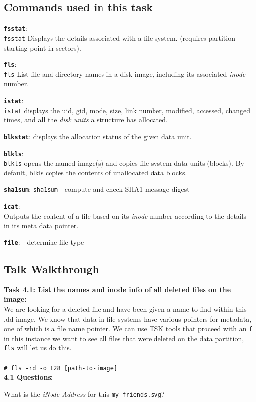 \documentclass[a4paper,11pt]{article}
\begin{document}
\subsection*{Commands used in this task}
\begin{itemize*}
	\item \textbf{\texttt{fsstat}}:\\ \texttt{fsstat} Displays the details associated with a file system. (requires partition starting point in sectors).
	\item \textbf{\texttt{fls}}:\\ \texttt{fls} List file and directory names in a disk image, including its associated \textit{inode} number.
	\item \textbf{\texttt{istat}}:\\ \texttt{istat}  displays the uid, gid, mode, size, link number, modified, accessed, changed times, and all the \textit{disk units} a structure has allocated.
	\item \textbf{\texttt{blkstat}}: displays the allocation status of the given data unit. 
	\item \textbf{\texttt{blkls}}:\\ \texttt{blkls} opens  the named image(s) and copies file system data units (blocks).  By default, blkls copies the contents of unallocated data blocks.
	\item \textbf{\texttt{sha1sum}}: \texttt{sha1sum}	- compute and check SHA1 message digest
	
	\item \textbf{\texttt{icat}}: \\  Outputs the content of a file based on its \textit{inode} number according to the details in its meta data pointer.
	
	\item \textbf{\texttt{file}}:  - determine file type
\end{itemize*}

\subsection*{Talk Walkthrough}
{\noindent
\textbf{Task 4.1: List the names and inode info of all deleted files on the image:}\\
We are looking for a deleted file and have been given a name to find within this .dd image. We know that data in file systems have various pointers for metadata, one of which is a file name pointer. We can use TSK tools that proceed with an \texttt{f} in this instance we want to see all files that were deleted on the data partition, \texttt{fls} will let us do this.\\
\\
\verb|# fls -rd -o 128 [path-to-image]|\\

\noindent
\textbf{4.1 Questions:}
\begin{enumerate*}
	\item What is the \textit{iNode Address} for this \texttt{my\_friends.svg}?\\
\end{enumerate*}
}
\end{document}
